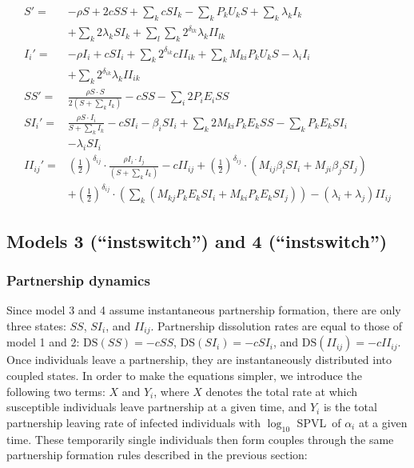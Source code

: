 \documentclass[10pt,letterpaper]{article}
\newcommand{\khalf}{\left(\frac{1}{2}\right)^{\delta_{ij}}}  %
\newcommand{\Lspvl}{$\log_{10}$ SPVL}
\newcommand{\DS}{\textrm{DS}}
\begin{document}
\begin{equation}
\begin{aligned}
S' =& - \rho S + 2 c SS + \sum_k c SI_k - \sum_k P_k U_k S + \sum_k \lambda_k I_k \\
&+ \sum_k 2 \lambda_k SI_k + \sum_l \sum_k  2^{\delta_{lk}} \lambda_k II_{lk}\\
I_i' =&  - \rho I_i + c SI_i + \sum_k 2^{\delta_{ik}} c  II_{ik} + \sum_k M_{ki} P_k U_k S- \lambda_i I_i \\
&+ \sum_k 2^{\delta_{ik}} \lambda_k II_{ik} \\
SS' =& \frac{\rho S \cdot S}{2 (S + \sum_k I_k)} - c SS - \sum_i 2 P_i E_i SS \\
SI_i' =& \frac{\rho S \cdot I_i}{S + \sum_k I_k} - c SI_i - \beta_i SI_i + \sum_k 2 M_{ki} P_k E_k SS - \sum_k P_k E_k SI_i   \\
&- \lambda_i SI_i\\
II_{ij}' =& \khalf \cdot \frac{\rho I_i \cdot I_j}{(S + \sum_k I_k)} - c II_{ij} + \khalf \cdot (M_{ij} \beta_i SI_i + M_{ji} \beta_j SI_j) \\
&+ \khalf \cdot (\sum_k (M_{kj} P_k E_k SI_i + M_{ki} P_k E_k SI_j)) -(\lambda_i + \lambda_j) II_{ij}
\end{aligned}
\end{equation}

\subsection*{Models 3 (``instswitch'') and 4 (``instswitch'')}
\subsubsection*{Partnership dynamics}

Since model 3 and 4 assume instantaneous partnership formation, there are only three states: $SS$, $SI_i$, and $II_{ij}$. Partnership dissolution rates are equal to those of model 1 and 2: $\DS(SS) = -cSS$, $\DS(SI_i) = - cSI_i$, and $\DS(II_{ij}) = - c II_{ij}$. Once individuals leave a partnership, they are instantaneously distributed into coupled states. In order to make the equations simpler, we introduce the following two terms: $X$ and $Y_i$, where $X$ denotes the total rate at which susceptible individuals leave partnership at a given time, and $Y_i$ is the total partnership leaving rate of infected individuals with \Lspvl\ of $\alpha_i$ at a given time. These temporarily single individuals then form couples through the same partnership formation rules described in the previous section:
\end{document}
